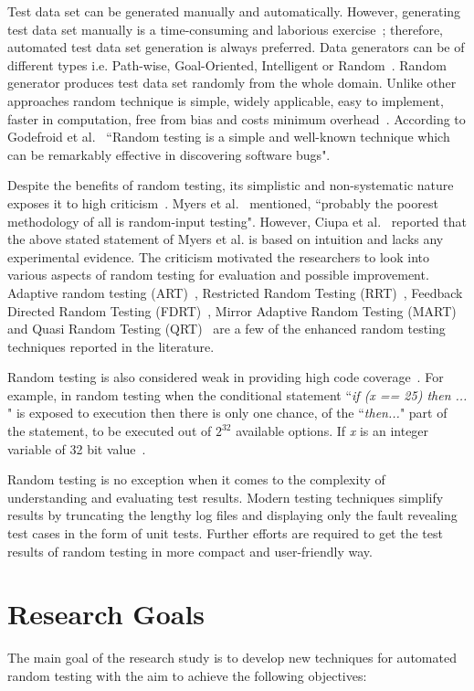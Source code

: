 Test data set can be generated manually and automatically. However, generating test data set manually is a time-consuming and laborious exercise~\cite{korel1990}; therefore, automated test data set generation is always preferred. Data generators can be of different types i.e. Path-wise, Goal-Oriented, Intelligent or Random~\cite{wiki2013}. Random generator produces test data set randomly from the whole domain. Unlike other approaches random technique is simple, widely applicable, easy to implement, faster in computation, free from bias and costs minimum overhead~\cite{Ciupa2007}. According to Godefroid et al.~\cite{Godefroid2005} ``Random testing is a simple and well-known technique which can be remarkably effective in discovering software bugs".

Despite the benefits of random testing, its simplistic and non-systematic nature exposes it to high criticism~\cite{white1987}. Myers et al.~\cite{Myers2011} mentioned, ``probably the poorest methodology of all is random-input testing". However, Ciupa et al.~\cite{Ciupa2008a} reported that the above stated statement of Myers et al. is based on intuition and lacks any experimental evidence. The criticism motivated the researchers to look into various aspects of random testing for evaluation and possible improvement. Adaptive random testing (ART)~\cite{Chen2008}, Restricted Random Testing (RRT)~\cite{Chan2002}, Feedback Directed Random Testing (FDRT)~\cite{Pacheco2007}, Mirror Adaptive Random Testing (MART)~\cite{Chen2003} and Quasi Random Testing (QRT)~\cite{Chen2005} are a few of the enhanced random testing techniques reported in the literature.

Random testing is also considered weak in providing high code coverage~\cite{cohen1997, Offutt1996}. For example, in random testing when the conditional statement  ``{\it if (x == 25) then ... }"  is exposed to execution then there is only one chance, of the ``{\it then...}" part of the statement, to be executed out of $2^\text{32}$ available options. If {\it x} is an integer variable of 32 bit value~\cite{Godefroid2005}. 

Random testing is no exception when it comes to the complexity of understanding and evaluating test results. Modern testing techniques simplify results by truncating the lengthy log files and displaying only the fault revealing test cases in the form of unit tests. Further efforts are required to get the test results of random testing in more compact and user-friendly way. 


\section{Research Goals} \label{ResearchGoals}
The main goal of the research study is to develop new techniques for automated random testing with the aim to achieve the following objectives:

